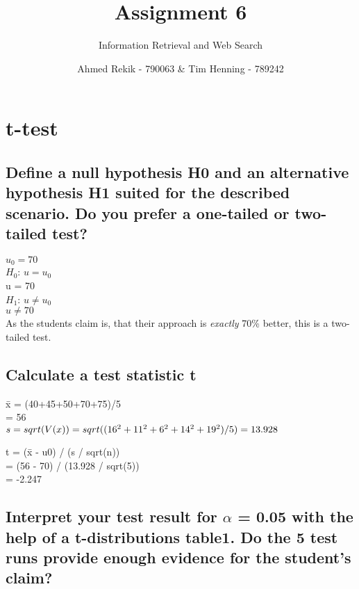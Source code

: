 \documentclass{scrartcl}
\title{Assignment 6}
\subtitle{Information Retrieval and Web Search}
\author{Ahmed Rekik - 790063 \& Tim Henning - 789242}
\begin{document}
\maketitle

\setcounter{section}{0}
\section{t-test}

\subsection{Define a null hypothesis H0 and an alternative hypothesis H1 suited for the described scenario. Do you prefer a one-tailed or two-tailed test?}

$u_0 = 70$\\

$H_0$: $u = u_0$\\
    u = 70\\

$H_1$: $u \neq u_0$\\
    $u \neq 70$\\

As the students claim is, that their approach is \textit{exactly} 70\% better, this is a two-tailed test.


\subsection{Calculate a test statistic t}

\={x} = (40+45+50+70+75)/5\\
      = 56\\

$s = sqrt(V(x))\\
  = sqrt((16^{2}+11^{2}+6^{2}+14^{2}+19^{2})/5)\\
  = 13.928\\
$

t = (\={x} - u0) / (s / sqrt(n))\\
  = (56 - 70) / (13.928 / sqrt(5))\\
  = -2.247\\
  
\subsection{Interpret your test result for $\alpha$ = 0.05 with the help of a t-distributions table1. Do the 5 test runs provide enough evidence for the student’s claim?}
\end{document}
